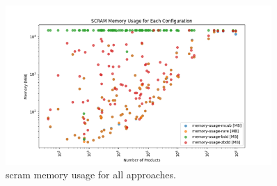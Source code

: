 \begin{figure}[H]
    \centering
    \includegraphics[width=0.9\textwidth]{3_identifying_gaps/benchmarking/profiling_methods/figures/scram_memory_usage.png}
    \caption{scram memory usage for all approaches.}
    \label{fig:scram_memory_usage}
\end{figure}